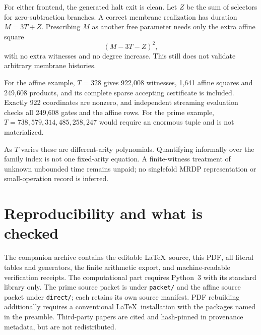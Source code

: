\documentclass[11pt,letterpaper]{article}
\theoremstyle{definition}
\theoremstyle{remark}
\newcommand{\file}[1]{\nolinkurl{#1}}
\begin{document}
For either frontend, the generated halt exit is clean. Let $Z$ be the sum of selectors for zero-subtraction branches. A correct membrane realization has duration $M=3T+Z$. Prescribing $M$ as another free parameter needs only the extra affine square
\[
 (M-3T-Z)^2,
\]
with no extra witnesses and no degree increase. This still does not validate arbitrary membrane histories.

For the affine example, $T=328$ gives 922,008 witnesses, 1,641 affine squares and 249,608 products, and its complete sparse accepting certificate is included. Exactly 922 coordinates are nonzero, and independent streaming evaluation checks all 249,608 gates and the affine rows. For the prime example, $T=738{,}579{,}314{,}485{,}258{,}247$ would require an enormous tuple and is not materialized.

As $T$ varies these are different-arity polynomials. Quantifying informally over the family index is not one fixed-arity equation. A finite-witness treatment of unknown unbounded time remains unpaid; no singlefold MRDP representation or small-operation record is inferred.

\section{Reproducibility and what is checked}\label{qoc:um:sec:reproduce}
The companion archive contains the editable \LaTeX\ source, this PDF, all literal tables and generators, the finite arithmetic export, and machine-readable verification receipts. The computational part requires Python~3 with its standard library only. The prime source packet is under \file{packet/} and the affine source packet under \file{direct/}; each retains its own source manifest. PDF rebuilding additionally requires a conventional \LaTeX\ installation with the packages named in the preamble. Third-party papers are cited and hash-pinned in provenance metadata, but are not redistributed.
\end{document}
